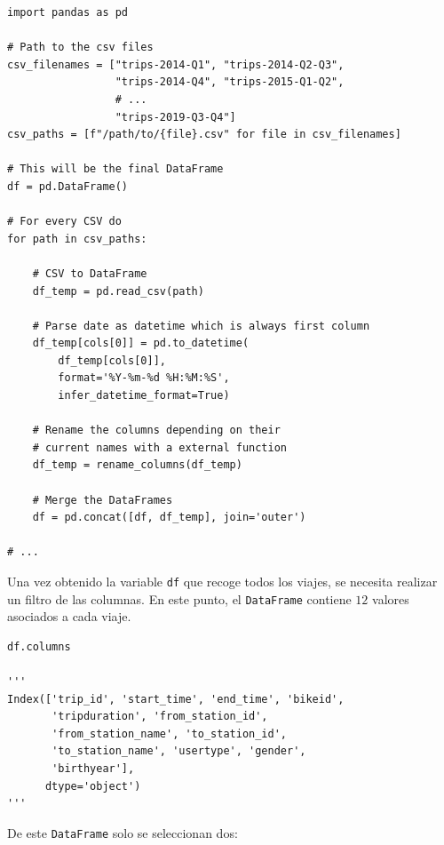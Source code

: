 \begin{verbatim}
import pandas as pd

# Path to the csv files
csv_filenames = ["trips-2014-Q1", "trips-2014-Q2-Q3", 
                 "trips-2014-Q4", "trips-2015-Q1-Q2",
                 # ...
                 "trips-2019-Q3-Q4"]
csv_paths = [f"/path/to/{file}.csv" for file in csv_filenames]

# This will be the final DataFrame
df = pd.DataFrame()

# For every CSV do
for path in csv_paths:
    
    # CSV to DataFrame
    df_temp = pd.read_csv(path)
    
    # Parse date as datetime which is always first column
    df_temp[cols[0]] = pd.to_datetime(
        df_temp[cols[0]], 
        format='%Y-%m-%d %H:%M:%S',
        infer_datetime_format=True)
    
    # Rename the columns depending on their
    # current names with a external function
    df_temp = rename_columns(df_temp)
    
    # Merge the DataFrames
    df = pd.concat([df, df_temp], join='outer')

# ...
\end{verbatim}

Una vez obtenido la variable \verb|df| que recoge todos los viajes, se necesita realizar un filtro de las columnas. En este punto, el \verb|DataFrame| contiene $12$ valores asociados a cada viaje.

\begin{verbatim}
df.columns

'''
Index(['trip_id', 'start_time', 'end_time', 'bikeid', 
       'tripduration', 'from_station_id', 
       'from_station_name', 'to_station_id',
       'to_station_name', 'usertype', 'gender',
       'birthyear'],
      dtype='object')
'''
\end{verbatim}

De este \verb|DataFrame| solo se seleccionan dos:

